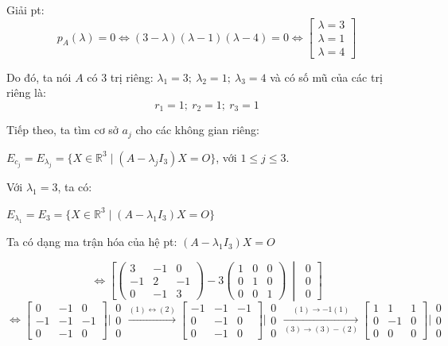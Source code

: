 \documentclass[12pt,a4paper]{article}
\newcommand{\R}{\mathbb{R}}
\begin{document}
Giải pt:
\[
p_A(\lambda)=0\Leftrightarrow (3-\lambda)(\lambda-1)(\lambda-4)=0\Leftrightarrow
\begin{bmatrix}\lambda=3\\ \lambda=1\\ \lambda=4\end{bmatrix}
\]

Do đó, ta nói $A$ có 3 trị riêng: $\lambda_1=3;\ \lambda_2=1;\ \lambda_3=4$ và có số mũ của các trị riêng là:
\[
r_1=1;\ r_2=1;\ r_3=1
\]

Tiếp theo, ta tìm cơ sở $a_j$ cho các không gian riêng:

$E_{c_j}=E_{\lambda_j}=\{X\in\R^3 \mid (A-\lambda_j I_3)X=O\}$, với $1\le j\le 3$.

\medskip
Với $\lambda_1=3$, ta có:

$E_{\lambda_1}=E_3=\{X\in\R^3 \mid (A-\lambda_1 I_3)X=O\}$

Ta có dạng ma trận hóa của hệ pt: $(A-\lambda_1I_3)X=O$

\[
\Leftrightarrow
\left[\begin{pmatrix}3 & -1 & 0\\ -1 & 2 & -1\\ 0 & -1 & 3\end{pmatrix}-3\begin{pmatrix}1&0&0\\0&1&0\\0&0&1\end{pmatrix}\ \middle|\ \begin{matrix}0\\0\\0\end{matrix}\right]
\]
\[
\Leftrightarrow
\begin{bmatrix}0 & -1 & 0\\ -1 & -1 & -1\\ 0 & -1 & 0\end{bmatrix}\big|\begin{matrix}0\\0\\0\end{matrix}
\xrightarrow{(1)\leftrightarrow(2)}
\begin{bmatrix}-1 & -1 & -1\\ 0 & -1 & 0\\ 0 & -1 & 0\end{bmatrix}\big|\begin{matrix}0\\0\\0\end{matrix}
\xrightarrow[(3)\to(3)-(2)]{(1)\to -1(1)}
\begin{bmatrix}1 & 1 & 1\\ 0 & -1 & 0\\ 0 & 0 & 0\end{bmatrix}\big|\begin{matrix}0\\0\\0\end{matrix}
\]
\end{document}

